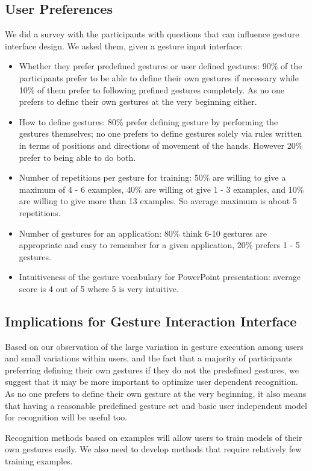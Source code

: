 \documentclass[conference]{IEEEtran}
\begin{document}
\subsection{User Preferences}
We did a survey with the participants with questions that can influence
gesture interface design. We asked them, given a gesture input interface:
\begin{itemize}
  \item Whether they prefer predefined gestures or user defined gestures: 90\%
  of the participants prefer to be able to define their own gestures if necessary while 10\% of them prefer to following prefined
gestures completely. As no one prefers to define their own gestures at the very
beginning either.
\item How to define gestures: 80\% prefer defining gesture by 
performing the gestures themselves; no one prefers to
define gestures solely via rules written in terms of positions and directions
of movement of the hands.
However 20\% prefer to being able to do both.
\item Number of repetitions per gesture for training: 50\% are willing to give a
maximum of 4 - 6 examples, 40\% are willing ot give 1 - 3 examples, and 10\% are
willing to give more than 13 examples. So average maximum is about 5
repetitions.
\item Number of gestures for an application: 80\% think 6-10 gestures are
appropriate and easy to remember for a given application, 20\% prefers 1 - 5
gestures.
\item Intuitiveness of the gesture vocabulary for PowerPoint presentation:
average score is 4 out of 5 where 5 is very intuitive.
\end{itemize}

\subsection{Implications for Gesture Interaction Interface}
Based on our observation of the large variation in gesture execution among
users and small variations within users, and the fact that a majority of
participants preferring defining their own gestures if they do not the
predefined gestures, we suggest that it may be more important to optimize user
dependent recognition. As no one prefers to define their own gesture at the very
beginning, it also means that having a reasonable predefined gesture set and
basic user independent model for recognition will be useful too.

Recognition methods based on examples will allow users to train models of their
own gestures easily. We also need to develop methods that
require relatively few training examples.
\end{document}
